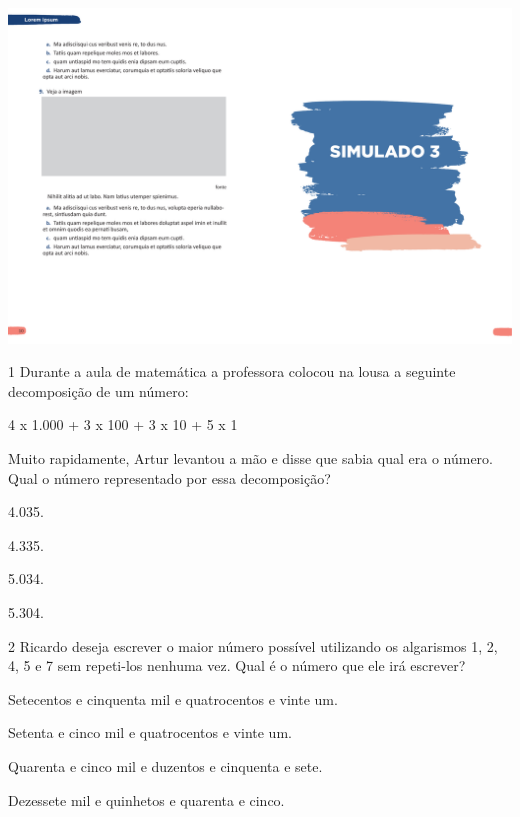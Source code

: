 \vspace*{-3.4cm}
\hspace*{-3.7cm}\includegraphics[scale=1]{../watermarks/3simulado5ano.pdf}

\pagebreak

\num{1} Durante a aula de matemática a professora colocou na lousa a seguinte decomposição de um número:

\begin{myquote}
4 x 1.000 + 3 x 100 + 3 x 10 + 5 x 1
\end{myquote}

Muito rapidamente, Artur levantou a mão e disse que sabia qual era o número. Qual o número representado por essa decomposição?

\begin{escolha}
\item
  4.035.
\item
  4.335.
\item
  5.034.
\item
  5.304.
\end{escolha}

\num{2} Ricardo deseja escrever o maior número possível utilizando os algarismos 1, 2, 4, 5 e 7 sem repeti-los nenhuma vez. Qual é o número que ele irá escrever?

\begin{escolha}
\item
  Setecentos e cinquenta mil e quatrocentos e vinte um.
\item
  Setenta e cinco mil e quatrocentos e vinte um.
\item
  Quarenta e cinco mil e duzentos e cinquenta e sete.
\item
  Dezessete mil e quinhetos e quarenta e cinco.
\end{escolha}


